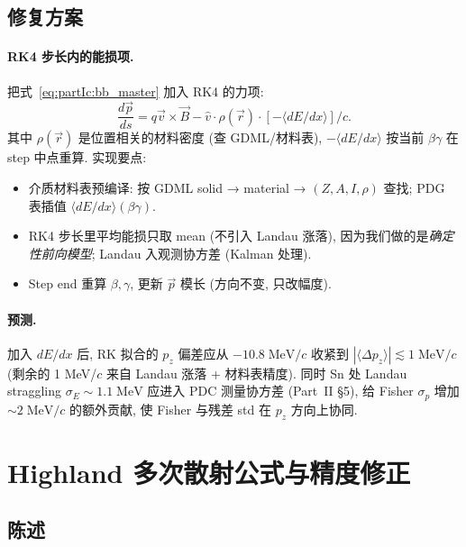 \subsection{修复方案}

\paragraph{RK4 步长内的能损项.} 把式~\eqref{eq:partIc:bb_master} 加入 RK4 的力项:
\begin{equation}
  \frac{d \vec p}{ds} = q \vec v \times \vec B
  -\hat v \cdot \rho(\vec r) \cdot \left[-\langle dE/dx \rangle\right] / c.
  \label{eq:partIc:rk4_with_dEdx}
\end{equation}
其中 $\rho(\vec r)$ 是位置相关的材料密度 (查 GDML/材料表), $-\langle dE/dx \rangle$ 按当前 $\beta\gamma$ 在 step 中点重算. 实现要点:
\begin{itemize}[nosep, leftmargin=2em]
  \item 介质材料表预编译: 按 GDML solid → material → $(Z, A, I, \rho)$ 查找; PDG 表插值 $\langle dE/dx \rangle (\beta\gamma)$.
  \item RK4 步长里平均能损只取 mean (不引入 Landau 涨落), 因为我们做的是\emph{确定性前向模型}; Landau 入观测协方差 (Kalman 处理).
  \item Step end 重算 $\beta, \gamma$, 更新 $\vec p$ 模长 (方向不变, 只改幅度).
\end{itemize}

\paragraph{预测.} 加入 $dE/dx$ 后, RK 拟合的 $p_z$ 偏差应从 $-10.8\;\mathrm{MeV}/c$ 收紧到 $|\langle \Delta p_z \rangle| \lesssim 1\;\mathrm{MeV}/c$ (剩余的 1 MeV/$c$ 来自 Landau 涨落 + 材料表精度). 同时 Sn 处 Landau straggling $\sigma_E \sim 1.1\;\mathrm{MeV}$ 应进入 PDC 测量协方差 (Part~II §5), 给 Fisher $\sigma_p$ 增加 $\sim 2\;\mathrm{MeV}/c$ 的额外贡献, 使 Fisher 与残差 std 在 $p_z$ 方向上协同.


\section{Highland 多次散射公式与精度修正}
\label{sec:partIc:highland}

\subsection{陈述}

